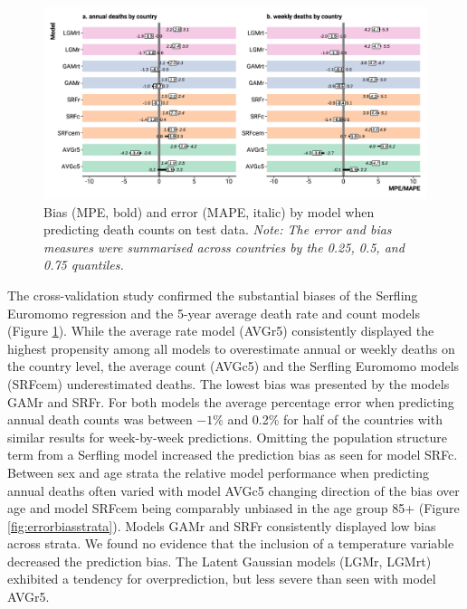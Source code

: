 \documentclass[12pt]{article}
\begin{document}

\begin{figure}
\caption{Bias (MPE, bold) and error (MAPE, italic) by model when predicting death counts on test data. \emph{Note: The error and bias measures were summarised across countries by the 0.25, 0.5, and 0.75 quantiles.}}
\label{fig:biaserror}
\includegraphics{errorbias.pdf}
\end{figure}

The cross-validation study confirmed the substantial biases of the Serfling Euromomo regression and the 5-year average death rate and count models (Figure \ref{fig:biaserror}). While the average rate model (AVGr5) consistently displayed the highest propensity among all models to overestimate annual or weekly deaths on the country level, the average count (AVGc5) and the Serfling Euromomo models (SRFcem) underestimated deaths. The lowest bias was presented by the models GAMr and SRFr. For both models the average percentage error when predicting annual death counts was between $-1\%$ and 0.2\% for half of the countries with similar results for week-by-week predictions. Omitting the population structure term from a Serfling model increased the prediction bias as seen for model SRFc. Between sex and age strata the relative model performance when predicting annual deaths often varied with model AVGc5 changing direction of the bias over age and model SRFcem being comparably unbiased in the age group 85+ (Figure \ref{fig:errorbiasstrata}). Models GAMr and SRFr consistently displayed low bias across strata. We found no evidence that the inclusion of a temperature variable decreased the prediction bias. The Latent Gaussian models (LGMr, LGMrt) exhibited a tendency for overprediction, but less severe than seen with model AVGr5.
\end{document}
